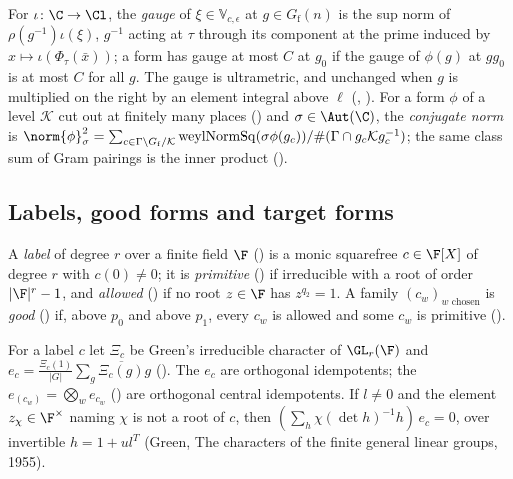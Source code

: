 \begin{definition}
\label{ub-objects:def:gauge}
For $\iota\colon\C\to\Cl$, the \emph{gauge} of $\xi\in \mathbb V_{c,\epsilon}$ at $g\in G_{\mathrm f}(n)$ is the sup norm of
$\rho(g^{-1})\iota(\xi)$, $g^{-1}$ acting at $\tau$ through its component at the prime induced by
$x\mapsto\iota(\Phi_\tau(\bar x))$; a form has gauge at most $C$ at $g_0$ if the gauge of $\phi(g)$ at
$gg_0$ is at most $C$ for all $g$. The gauge is ultrametric, and unchanged when $g$ is multiplied on
the right by an element integral above $\ell$ (,
). For a form $\phi$ of a level $\mathcal K$ cut out at finitely
many places () and $\sigma\in\Aut(\C)$, the \emph{conjugate norm} is
$\norm{\phi}_\sigma^2=\sum_{c\in\Gamma\backslash G_{\mathrm f}/\mathcal K}\operatorname{weylNormSq}(\sigma\phi(g_c))/
\#(\Gamma\cap g_c\mathcal Kg_c^{-1})$; the same class sum of Gram pairings is the inner product
().
\end{definition}

\subsection{Labels, good forms and target forms}\label{ub-objects:sec:target}

A \emph{label} of degree $r$ over a finite field $\F$ () is a monic squarefree
$c\in \F[X]$ of degree $r$ with $c(0)\ne0$; it is \emph{primitive} ()
if irreducible with a root of order $|\F|^r-1$, and \emph{allowed} ()
if no root $z\in \F$ has $z^{q_2}=1$. A family $(c_w)_{w\text{ chosen}}$ is \emph{good}
() if, above $p_0$ and above $p_1$, every $c_w$ is allowed and some
$c_w$ is primitive ().

\begin{fact}
\label{ub-objects:fact:green}
For a label $c$ let $\Xi_c$ be Green's irreducible character of $\GL_r(\F)$ and
$e_c=\frac{\Xi_c(1)}{|G|}\sum_g\overline{\Xi_c(g)}g$ (). The $e_c$ are
orthogonal idempotents; the $e_{(c_w)}=\bigotimes_we_{c_w}$ () are orthogonal
central idempotents. If $l\ne0$ and the element $z_\chi\in \F^\times$ naming $\chi$ is not a root of
$c$, then $(\sum_h\chi(\det h)^{-1}h)\,e_c=0$, over invertible $h=1+ul^T$ (Green, The characters of
the finite general linear groups, 1955).
\end{fact}

